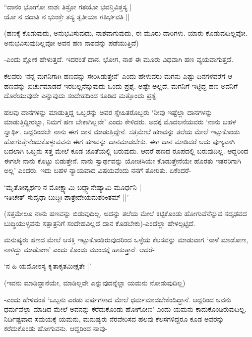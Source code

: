 \begin{shloka}
``ದಾನಂ ಭೋಗೋ ನಾಶಃ ತಿಸ್ರೋ ಗತಯೋ ಭವನ್ತಿವಿತ್ತಸ್ಯ |\\
ಯೋ ನ ದದಾತಿ ನ ಭುಂಕ್ತೇ ತಸ್ಯ ತೃತೀಯಾ ಗತಿರ್ಭವತಿ ||
\end{shloka}

(ಹಣಕ್ಕೆ ಕೊಡುವುದು, ಅನುಭವಿಸುವುದು, ನಾಶವಾಗುವುದು, ಈ ಮೂರು ದಾರಿಗಳು. ಯಾರು ಕೊಡುವುದಿಲ್ಲವೋ. ಅನುಭವಿಸುವುದಿಲ್ಲವೋ ಅವನ ಹಣ ನಾಶವನ್ನು ಪಡೆಯುತ್ತಿದೆ)

-ಎಂದು ಶ್ಲೋಕ ಹೇಳುತ್ತದೆ. ಇದರಂತೆ ದಾನ, ಭೋಗ, ನಾಶ ಈ ಮೂರು ವಿಧವಾಗಿ ಹಣ ವ್ಯಯವಾಗುತ್ತದೆ.

ಕೆಲವರು `ನನ್ನ ಮಗನಿಗಾಗಿ ಹಣವನ್ನು ಸೇರಿಸಿಡುತ್ತೇನೆ' ಎಂದು ಹೇಳುವರು ಮಗನು ಎಷ್ಟು ದಿನಗಳವರೆಗೆ ಆ ಹಣವನ್ನು ಖರ್ಚುಮಾಡದೆ ಇರಬಲ್ಲನೆನ್ನುವುದು ಒಂದು ಪ್ರಶ್ನೆ. ಅಷ್ಟೇ ಅಲ್ಲದೆ, ಮಗನಿಗೆ ಇಟ್ಟಿದ್ದ ಹಣ ಅವನಿಗೆ ದೊರೆಯುವುದೇ ಎನ್ನುವುದು ಸಂದೇಹದಿಂದ ಕೂಡಿದ ಮತ್ತೊಂದು ಪ್ರಶ್ನೆ.

ಹಲವು ದಾನಗಳನ್ನು ಮಾಡುತ್ತಿದ್ದ ಒಬ್ಬರನ್ನು ಅವರ ಸ್ನೇಹಿತರೊಬ್ಬರು `ನೀವು ಇಷ್ಟೆಲ್ಲಾ ದಾನಗಳನ್ನು ಮಾಡುತ್ತಿದ್ದೀರಲ್ಲಾ, ನಿಮಗೆ ಹಣ ಬೇಕಾಗಿಲ್ಲವೇ' ಎಂದು ಕೇಳಿದರು. ಅದಕ್ಕೆ ಮೊದಲನೆಯವರು `ನಾನು ಬಹಳ ಸ್ವಾರ್ಥಿ. ಆದ್ದರಿಂದಲೇ ನಾನು ಈಗ ದಾನ ಮಾಡುತ್ತಿದ್ದೇನೆ. ಸತ್ತಮೇಲೆ ಹಣವನ್ನು ತಲೆಯ ಮೇಲೆ ಇಟ್ಟುಕೊಂಡು ಹೋಗುತ್ತೇನೆಂದುಕೊಳ್ಳುವವನು ಈಗ ಹಣವನ್ನು ದಾನಮಾಡಬೇಕು. ಈಗ ದಾನ ಮಾಡಿದರೆ ಅದು ಪುಣ್ಯವಾಗಿ ಬದಲಾಗಿ ಒಬ್ಬನು ಸತ್ತ ಮೇಲೆ ಕೂಡ ಜೊತೆಯಲ್ಲಿ ಬರುವುದು. ಆದರೆ ಹಣದ ರೂಪದಲ್ಲಿ ಬರುವುದಿಲ್ಲ. ಆದ್ದರಿಂದ ಈಗಲೇ ನಾನು ಕೊಟ್ಟು ಬಿಡುತ್ತೇನೆ. ನಾನು ಸ್ವಾರ್ಥವನ್ನು ಯೋಚಿಸಿಯೇ ಕೊಡುತ್ತೇನೆಯೇ ಹೊರತು ಇತರರಿಗಾಗಿ ಅಲ್ಲ' ಎಂದರು. ಇದು ಬಹಳ ನ್ಯಾಯವಾದ ವಿಷಯವೆಂದು ನನಗೆ ತೋರಿತು. ಏಕೆಂದರೆ-

\begin{shloka}
`ಮೃತೋಪ್ಯರ್ಥಂ ನ ಮೋಕ್ಷ್ಯಾಮಿ ಬದ್ಧ್ಯಾನೇಷ್ಯಾಮಿ ಮೂರ್ಧನಿ |\\
ಇತಿಚೇತ್ ಸುದೃಢಾ ಬುದ್ಧಿಃ ಪಾತ್ರೇದೇಯಮಶಂಕಿತಮ್ ||'
\end{shloka}

(ಸತ್ತಮೇಲೂ ನಾನು ಹಣವನ್ನು ಬಿಡುವುದಿಲ್ಲ. ಅದನ್ನು ತಲೆಯ ಮೇಲೆ ಕಟ್ಟಿಕೊಂಡು ಹೋಗುವೆನೆನ್ನುವ ಸದೃಢವದ ಬುದ್ಧಿಯುಳ್ಳವನು ಸತ್ಪಾತ್ರನಿಗೆ ಸಂದೇಹವಿಲ್ಲದೆ ದಾನ ಕೊಡಬೇಕು)-ಎಂದೆಲ್ಲಾ ಹೇಳಲ್ಪಟ್ಟಿದೆ.

ಮನುಷ್ಯರು ಹಣದ ಮೇಲೆ ಆಸಕ್ತಿ ಇಟ್ಟುಕೊಂಡಿರುವುದರಿಂದ ಒಳ್ಳೆಯ ಕೆಲಸವನ್ನು ಮಾಡುವಾಗ `ನಾಳೆ ಮಾಡೋಣ, ನಾಳಿದ್ದು ಮಾಡೋಣ' ಎಂದು ಕೊಂಡು ಮುಂದಕ್ಕೆ ಹಾಕುತ್ತಾರೆ. ಆದರೆ-

\begin{shloka}
`ನ ಹಿ ಯಮೋಽಸ್ಯ ಕೃತಾಕೃತಮೀಕ್ಷತೇ‌ |'
\end{shloka}

(ಇವನು ಮಾಡಿದ್ದಾನೆಯೇ, ಮಾಡಿಲ್ಲವೇ ಎನ್ನುವುದನ್ನೆಲ್ಲಾ ಯಮನು ನೋಡುವುದಿಲ್ಲ)

-ಎಂದು ಹೇಳಿದಂತೆ `ಒಬ್ಬನು ಎರಡು ವರ್ಷಗಳಾದ ಮೇಲೆ ಧರ್ಮಮಾಡಬೇಕೆಂದಿದ್ದಾನೆ. ಆದ್ದರಿಂದ ಅವನು ಧರ್ಮವೆಲ್ಲಾ ಮಾಡಿದ ಮೇಲೆ ಅವನನ್ನು ಕರೆದುಕೊಂಡು ಹೋಗೋಣ' ಎಂದು ಯಮನು ಕಾದುಕೊಂಡಿರುವುದಿಲ್ಲ. ನಿರ್ದಿಷ್ಟವಾದ ಸಮಯಕ್ಕೆ ಯಮನು, ಮನುಷ್ಯರು ನೆರವೇರಿಸದ ಹಲವು ಕೆಲಸಗಳಿದ್ದರೂ ಕೂಡ ಅವರನ್ನು ಕರೆದುಕೊಂಡು ಹೋಗುವನು. ಆದ್ದರಿಂದ ನಾವು-

